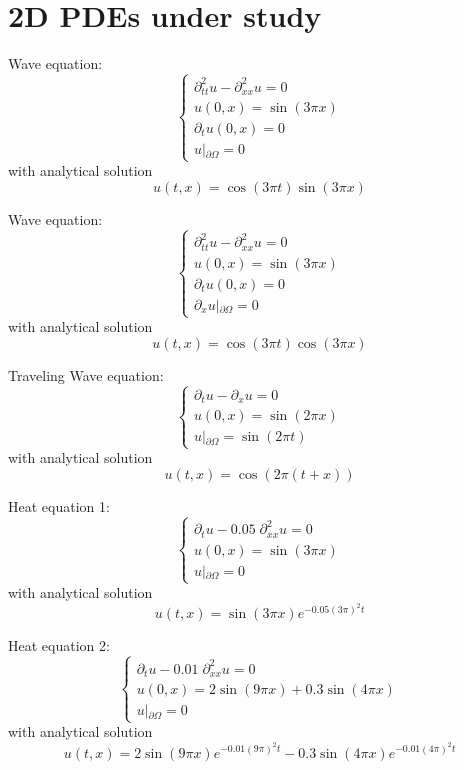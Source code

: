 \documentclass{article}
\begin{document}
\section{2D PDEs under study}
\label{app:2D}
\begin{enumerate}[label={[\arabic*]}]

\item{Wave equation:
\[\left\{ \begin{array}{llllllll}
\partial_{tt}^2 u - \partial_{xx}^2 u = 0 \\
u(0,x)=\sin(3\pi x)\\
\partial_t u(0,x)=0\\
u\left|_{\partial\Omega}\right.=0
\end{array}
\right.\]
with analytical solution
\[u(t,x)=\cos(3\pi t)\sin(3\pi x)\]
\label{eq:Wave2D}}

\item{Wave equation: 
\[\left\{ \begin{array}{llllllll}
\partial_{tt}^2 u - \partial_{xx}^2 u = 0\\
u(0,x)=\sin(3\pi x)\\
\partial_t u(0,x)=0 \\
\partial_x u\left|_{\partial\Omega}\right.=0
\end{array}
\right.\]
with analytical solution
\[u(t,x)=\cos(3\pi t)\cos(3\pi x)\]\label{eq:Wave2D2}}

\item{Traveling Wave equation:
\[\left\{ \begin{array}{llllllll}
\partial_{t} u - \partial_{x} u = 0 \\
u(0,x)=\sin(2\pi x)\\
u\left|_{\partial\Omega}\right.=\sin(2\pi t)
\end{array}
\right.\]
with analytical solution
\[u(t,x)=\cos\left(2\pi (t+ x)\right)\]\label{eq:Wave2DTravelling}}

\item{Heat equation 1:
\[\left\{ \begin{array}{llllllll}
\partial_{t} u - 0.05\; \partial_{xx}^2 u = 0\\
u(0,x)=\sin(3\pi x)\\
u\left|_{\partial\Omega}\right.=0
\end{array}
\right.\]
with analytical solution
\[u(t,x)=\sin(3\pi x)e^{-0.05(3\pi)^2t}\]\label{eq:Heat2D1}}

\item{Heat equation 2:
\[\left\{ \begin{array}{llllllll}
\partial_{t} u - 0.01\; \partial_{xx}^2 u = 0\\
u(0,x)=2\sin(9\pi x)+0.3 \sin(4\pi x)\\
u\left|_{\partial\Omega}\right.=0
\end{array}
\right.\]
with analytical solution
\[u(t,x)=2 \sin(9\pi x)e^{-0.01(9\pi)^2t}-0.3 \sin(4\pi x)e^{-0.01(4\pi)^2t}\]\label{eq:Heat2D2}}


\end{enumerate}
\end{document}
